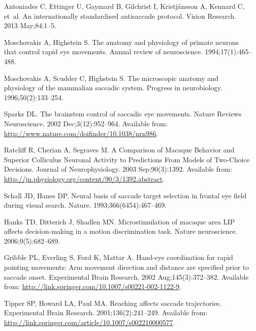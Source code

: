 \documentclass[10pt,letterpaper]{article}
\begin{document}
\begin{thebibliography}{10}
Antoniades C, Ettinger U, Gaymard B, Gilchrist I, Kristjánsson A, Kennard C,
  et~al.
\newblock An internationally standardised antisaccade protocol.
\newblock Vision Research. 2013 May;84:1--5.

Moschovakis A, Highstein S.
\newblock The anatomy and physiology of primate neurons that control rapid eye
  movements.
\newblock Annual review of neuroscience. 1994;17(1):465--488.

Moschovakis A, Scudder C, Highstein S.
\newblock The microscopic anatomy and physiology of the mammalian saccadic
  system.
\newblock Progress in neurobiology. 1996;50(2):133--254.

Sparks DL.
\newblock The brainstem control of saccadic eye movements.
\newblock Nature Reviews Neuroscience. 2002 Dec;3(12):952--964.
\newblock Available from: \url{http://www.nature.com/doifinder/10.1038/nrn986}.

Ratcliff R, Cherian A, Segraves M.
\newblock A {Comparison} of {Macaque} {Behavior} and {Superior} {Colliculus}
  {Neuronal} {Activity} to {Predictions} {From} {Models} of {Two}-{Choice}
  {Decisions}.
\newblock Journal of Neurophysiology. 2003 Sep;90(3):1392.
\newblock Available from:
  \url{http://jn.physiology.org/content/90/3/1392.abstract}.

Schall JD, Hanes DP.
\newblock Neural basis of saccade target selection in frontal eye field during
  visual search.
\newblock Nature. 1993;366(6454):467--469.

Hanks TD, Ditterich J, Shadlen MN.
\newblock Microstimulation of macaque area {LIP} affects decision-making in a
  motion discrimination task.
\newblock Nature neuroscience. 2006;9(5):682--689.

Gribble PL, Everling S, Ford K, Mattar A.
\newblock Hand-eye coordination for rapid pointing movements: {Arm} movement
  direction and distance are specified prior to saccade onset.
\newblock Experimental Brain Research. 2002 Aug;145(3):372--382.
\newblock Available from:
  \url{http://link.springer.com/10.1007/s00221-002-1122-9}.

Tipper SP, Howard LA, Paul MA.
\newblock Reaching affects saccade trajectories.
\newblock Experimental Brain Research. 2001;136(2):241--249.
\newblock Available from:
  \url{http://link.springer.com/article/10.1007/s002210000577}.


\end{thebibliography}
\end{document}
